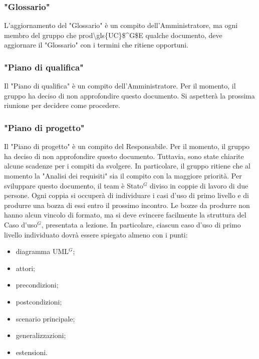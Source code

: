 \subsubsection{"Glossario"}
L'aggiornamento del "Glossario" è un compito dell'Amministratore, ma ogni membro
del gruppo che prod\gls{\gls{UC}$^G$E} qualche documento, deve aggiornare il "Glossario" con i
termini che ritiene opportuni.

\subsubsection{"Piano di qualifica"}
Il "Piano di qualifica" è un compito dell'Amministratore. Per il momento, il
gruppo ha deciso di non approfondire questo documento. Si aspetterà la prossima
riunione per decidere come procedere.

\subsubsection{"Piano di progetto"}
Il "Piano di progetto" è un compito del Responsabile. Per il momento, il gruppo
ha deciso di non approfondire questo documento. Tuttavia, sono state chiarite
alcune scadenze per i compiti da svolgere. In particolare, il gruppo ritiene
che al momento la "Analisi dei requisiti" sia il compito con la maggiore priorità.
Per sviluppare questo documento, il team è \gls{Stato}$^G$ diviso in coppie di lavoro di
due persone. Ogni coppia si occuperà di individuare i casi d'uso di primo
livello e di produrre una bozza di essi entro il prossimo incontro. Le bozze da
produrre non hanno alcun vincolo di formato, ma si deve evincere facilmente la
struttura del \gls{Caso d'uso}$^G$, presentata a lezione. In particolare, ciascun caso
d'uso di primo livello individuato dovrà essere spiegato almeno con i punti:
\begin{itemize}
	\item diagramma \gls{UML}$^G$;
	\item attori;
	\item precondizioni;
	\item postcondizioni;
	\item scenario principale;
	\item generalizzazioni;
	\item estensioni.
\end{itemize}

